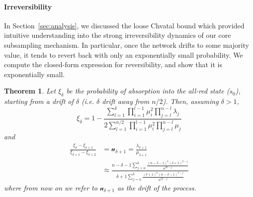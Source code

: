 \documentclass[letterpaper,twocolumn,10pt]{article}
\newcommand\ddfrac[2]{\frac{\displaystyle #1}{\displaystyle #2}}
\newtheorem{theorem}{Theorem}
\theoremstyle{definition}
\begin{document}
\begin{appendices}
\paragraph{Irreversibility}
In Section~\ref{sec:analysis}, we discussed the loose Chvatal bound which provided intuitive understanding into the strong irreversibility dynamics of our core subsampling mechanism. In particular, once the network drifts to some majority value, it tends to revert back with only an exponentially small probability. We compute the closed-form expression for reversibility, and show that it is exponentially small.
\begin{theorem}
\label{theorem:slush_prob_convergence_minority}
Let $\xi_\delta$ be the probability of absorption into the all-red state ($s_0$), starting from a drift of $\delta$ (i.e. $\delta$ drift away from $n/2$). Then, assuming $\delta > 1$, 
\begin{equation}
\xi_\delta = 1 - \ddfrac{\sum_{l = 1}^{\delta} \prod_{i = 1}^{l-1} \mu_i^2 \prod_{j = l}^{n-l}\lambda_j}{2\sum_{l = 1}^{n/2}\prod_{i=1}^{l-1}\mu_i^2\prod_{j=l}^{n-l}\mu_j}
\end{equation}
and
\begin{equation}
\begin{split}
\ddfrac{\xi_{\delta} - \xi_{\delta+1}}{\xi_{\delta+1} - \xi_{\delta+2}} &= \mathcal{u}_{\delta+1} = \ddfrac{\lambda_{\delta+1}}{\mu_{\delta+1}} \\
&\approx \ddfrac{n-\delta-1 \sum_{j = \alpha}^{k}\ddfrac{(n-\delta-1)^k (\delta+1)^{k-j}}{n^{2k - j}}}{\delta+1 \sum_{j = \alpha}^{k}\ddfrac{(\delta+1)^k (n-\delta-1)^{k-j}}{n^{2k - j}}}
\end{split}
\end{equation}
where from now on we refer to $\mathcal{u}_{\delta+1}$ as the drift of the process. 
\end{theorem}


\end{appendices}
\end{document}
